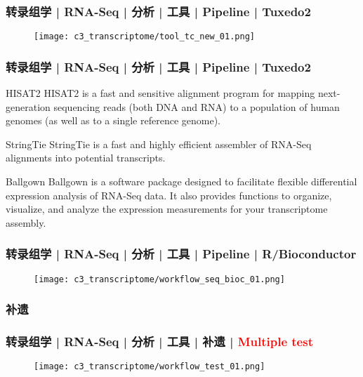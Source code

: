 \begin{frame}
  \frametitle{转录组学 | RNA-Seq | 分析 | 工具 | Pipeline | \alert{Tuxedo2}}
  \begin{figure}
    \centering
    \texttt{[image: c3\_transcriptome/tool\_tc\_new\_01.png]}
  \end{figure}
\end{frame}

\begin{frame}
  \frametitle{转录组学 | RNA-Seq | 分析 | 工具 | Pipeline | \alert{Tuxedo2}}
  \begin{block}{HISAT2}
    HISAT2 is a fast and sensitive alignment program for mapping next-generation sequencing reads (both DNA and RNA) to a population of human genomes (as well as to a single reference genome).
  \end{block}
  \pause
  \begin{block}{StringTie}
    StringTie is a fast and highly efficient assembler of RNA-Seq alignments into potential transcripts.
  \end{block}
  \pause
  \begin{block}{Ballgown}
    Ballgown is a software package designed to facilitate flexible differential expression analysis of RNA-Seq data. It also provides functions to organize, visualize, and analyze the expression measurements for your transcriptome assembly.
  \end{block}
\end{frame}

\begin{frame}
  \frametitle{转录组学 | RNA-Seq | 分析 | 工具 | Pipeline | R/Bioconductor}
  \begin{figure}
    \centering
    \texttt{[image: c3\_transcriptome/workflow\_seq\_bioc\_01.png]}
  \end{figure}
\end{frame}

\subsubsection{补遗}
\begin{frame}
  \frametitle{转录组学 | RNA-Seq | 分析 | 工具 | 补遗 | \textcolor{red}{Multiple test}}
  \begin{figure}
    \centering
    \texttt{[image: c3\_transcriptome/workflow\_test\_01.png]}
  \end{figure}
\end{frame}

